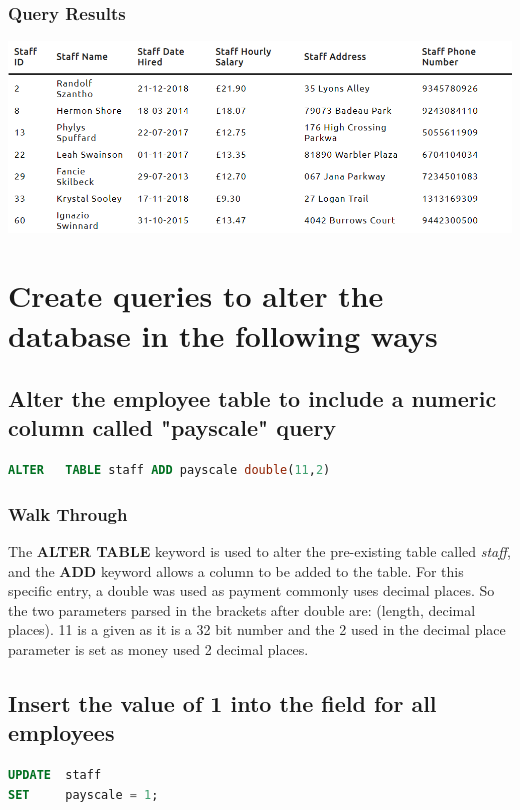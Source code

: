 \documentclass{article}
\begin{document}
\subsubsection{Query Results}
\includegraphics[width=\linewidth]{images/10.png}

\section{Create queries to alter the database in the following ways}

\subsection{Alter the employee table to include a numeric column called "payscale" query}
\begin{lstlisting}[language=sql, caption=Add Payscale, style=mystyle]
ALTER   TABLE staff ADD payscale double(11,2)
\end{lstlisting}

\subsubsection{Walk Through} The \textbf{ALTER TABLE} keyword is used to alter the pre-existing table called \textit{staff}, and the \textbf{ADD} keyword allows a column to be added to the table. For this specific entry, a double was used as payment commonly uses decimal places. So the two parameters parsed in the brackets after double are: (length, decimal places). 11 is a given as it is a 32 bit number and the 2 used in the decimal place parameter is set as money used 2 decimal places.

\subsection{Insert the value of 1 into the field for all employees}
\begin{lstlisting}[language=sql, caption=Insert Value, style=mystyle]
UPDATE  staff
SET     payscale = 1;
\end{lstlisting}
\end{document}
